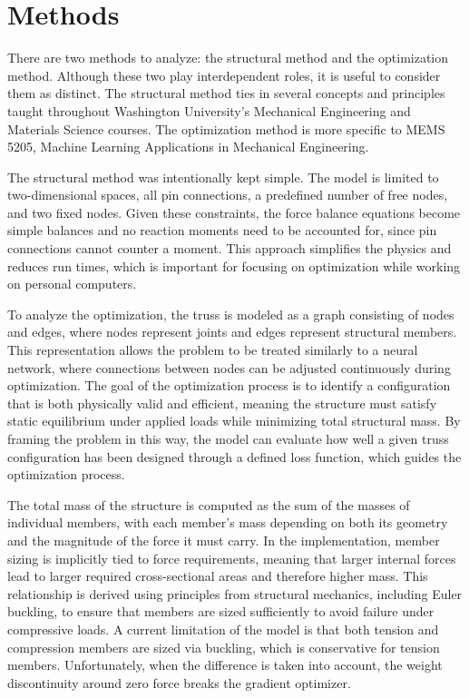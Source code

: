 \documentclass[11pt]{article}
\begin{document}
\section{Methods}

There are two methods to analyze: the structural method and the optimization method. Although these two play interdependent roles, it is useful to consider them as distinct. The structural method ties in several concepts and principles taught throughout Washington University's Mechanical Engineering and Materials Science courses. The optimization method is more specific to MEMS 5205, Machine Learning Applications in Mechanical Engineering.

The structural method was intentionally kept simple. The model is limited to two-dimensional spaces, all pin connections, a predefined number of free nodes, and two fixed nodes. Given these constraints, the force balance equations become simple balances and no reaction moments need to be accounted for, since pin connections cannot counter a moment. This approach simplifies the physics and reduces run times, which is important for focusing on optimization while working on personal computers.

To analyze the optimization, the truss is modeled as a graph consisting of nodes and edges, where nodes represent joints and edges represent structural members. This representation allows the problem to be treated similarly to a neural network, where connections between nodes can be adjusted continuously during optimization. The goal of the optimization process is to identify a configuration that is both physically valid and efficient, meaning the structure must satisfy static equilibrium under applied loads while minimizing total structural mass. By framing the problem in this way, the model can evaluate how well a given truss configuration has been designed through a defined loss function, which guides the optimization process.

The total mass of the structure is computed as the sum of the masses of individual members, with each member's mass depending on both its geometry and the magnitude of the force it must carry. In the implementation, member sizing is implicitly tied to force requirements, meaning that larger internal forces lead to larger required cross-sectional areas and therefore higher mass. This relationship is derived using principles from structural mechanics, including Euler buckling, to ensure that members are sized sufficiently to avoid failure under compressive loads. A current limitation of the model is that both tension and compression members are sized via buckling, which is conservative for tension members. Unfortunately, when the difference is taken into account, the weight discontinuity around zero force breaks the gradient optimizer.
\end{document}
